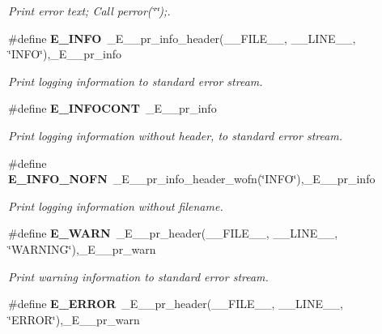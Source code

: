 \begin{CompactItemize}
\begin{CompactList}\small\item\em Print error text; Call perror(\char`\"{}\char`\"{});. \item\end{CompactList}\item 
\#define {\bf E\_\-INFO}~\_\-E\_\-\_\-pr\_\-info\_\-header(\_\-\_\-FILE\_\-\_\-, \_\-\_\-LINE\_\-\_\-, \char`\"{}INFO\char`\"{}),\_\-E\_\-\_\-pr\_\-info\label{err_8h_c3c705943d946708cea0a1443be1c853}

\begin{CompactList}\small\item\em Print logging information to standard error stream. \item\end{CompactList}\item 
\#define {\bf E\_\-INFOCONT}~\_\-E\_\-\_\-pr\_\-info\label{err_8h_e5a17ac5be8c738d3d977b1bea2d4538}

\begin{CompactList}\small\item\em Print logging information without header, to standard error stream. \item\end{CompactList}\item 
\#define {\bf E\_\-INFO\_\-NOFN}~\_\-E\_\-\_\-pr\_\-info\_\-header\_\-wofn(\char`\"{}INFO\char`\"{}),\_\-E\_\-\_\-pr\_\-info\label{err_8h_d95ccef073dd6f3c81c84e6aedca1f16}

\begin{CompactList}\small\item\em Print logging information without filename. \item\end{CompactList}\item 
\#define {\bf E\_\-WARN}~\_\-E\_\-\_\-pr\_\-header(\_\-\_\-FILE\_\-\_\-, \_\-\_\-LINE\_\-\_\-, \char`\"{}WARNING\char`\"{}),\_\-E\_\-\_\-pr\_\-warn\label{err_8h_6a794bec721b555ac1f2167f9e12f662}

\begin{CompactList}\small\item\em Print warning information to standard error stream. \item\end{CompactList}\item 
\#define {\bf E\_\-ERROR}~\_\-E\_\-\_\-pr\_\-header(\_\-\_\-FILE\_\-\_\-, \_\-\_\-LINE\_\-\_\-, \char`\"{}ERROR\char`\"{}),\_\-E\_\-\_\-pr\_\-warn\label{err_8h_5f7b2f58f5a663a6bdd51f197ae21993}


\end{CompactItemize}
